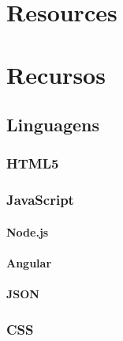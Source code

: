 {\chapter[Appendix A]{Resources}}
{\chapter[Apêndice A]{Recursos}}



 



%
\newpage

\section{Linguagens}
\subsection{HTML5}


\subsection{JavaScript}
\subsubsection{Node.js}
\subsubsection{Angular}
\subsubsection{JSON}



\subsection{CSS}

